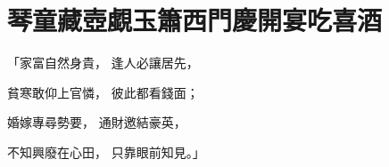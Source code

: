 %

\chapter{琴童藏壺覷玉簫\KG 西門慶開宴吃喜酒}


\begin{showcontents}{}




「家富自然身貴，   逢人必讓居先，

貧寒敢仰上官憐，  彼此都看錢面；

婚嫁專尋勢要，   通財邀結豪英，

不知興廢在心田，  只靠眼前知見。」


\end{showcontents}
